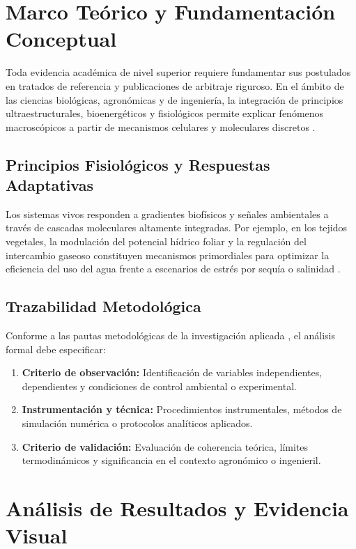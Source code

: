 \documentclass[
	spanish,
	letterpaper, oneside
]{article}
\begin{document}
\section{Marco Teórico y Fundamentación Conceptual}

Toda evidencia académica de nivel superior requiere fundamentar sus postulados en tratados de referencia y publicaciones de arbitraje riguroso. En el ámbito de las ciencias biológicas, agronómicas y de ingeniería, la integración de principios ultraestructurales, bioenergéticos y fisiológicos permite explicar fenómenos macroscópicos a partir de mecanismos celulares y moleculares discretos \citep{albertsMolecularBiology2022,nelsonLehningerBiochemistry2021}.

\subsection{Principios Fisiológicos y Respuestas Adaptativas}
Los sistemas vivos responden a gradientes biofísicos y señales ambientales a través de cascadas moleculares altamente integradas. Por ejemplo, en los tejidos vegetales, la modulación del potencial hídrico foliar y la regulación del intercambio gaseoso constituyen mecanismos primordiales para optimizar la eficiencia del uso del agua frente a escenarios de estrés por sequía o salinidad \citep{taizPlantPhysiology2015,karpBiologiaCelular2019}. 

\subsection{Trazabilidad Metodológica}
Conforme a las pautas metodológicas de la investigación aplicada \citep{hernandezSampieriMetodologia2018}, el análisis formal debe especificar:
\begin{enumerate}
	\item \textbf{Criterio de observación:} Identificación de variables independientes, dependientes y condiciones de control ambiental o experimental.
	\item \textbf{Instrumentación y técnica:} Procedimientos instrumentales, métodos de simulación numérica o protocolos analíticos aplicados.
	\item \textbf{Criterio de validación:} Evaluación de coherencia teórica, límites termodinámicos y significancia en el contexto agronómico o ingenieril.
\end{enumerate}

\section{Análisis de Resultados y Evidencia Visual}
\end{document}
